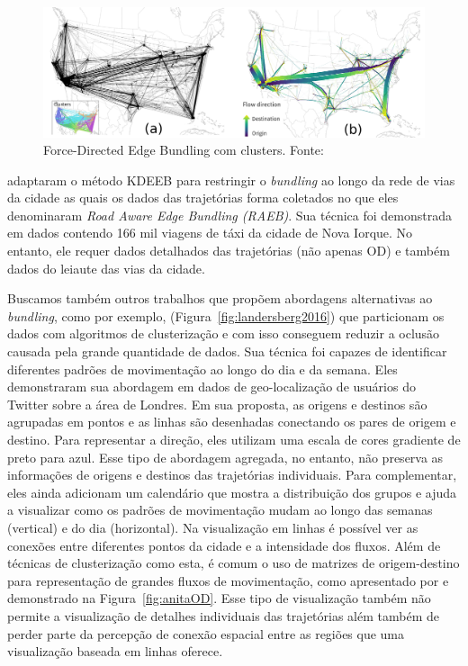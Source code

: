  \begin{figure}[!htb]
  \centering
  \includegraphics[width=\textwidth]{../figuras/anita.png}
  \caption[\emph{Force-Directed Edge Bundling} com clusters]{Force-Directed Edge Bundling com clusters. Fonte: \citet{Anita2017}}
   \label{fig:anita}
 \end{figure}

\citet{zeng:19} adaptaram o método KDEEB para restringir o \emph{bundling} ao
longo da rede de vias da cidade as quais os dados das trajetórias forma
coletados no que eles denominaram \emph{Road Aware Edge Bundling (RAEB)}. Sua
técnica foi demonstrada em dados contendo 166 mil viagens de táxi da cidade de
Nova Iorque. No entanto, ele requer dados detalhados das trajetórias (não apenas
OD) e também dados do leiaute das vias da cidade.

Buscamos também outros trabalhos que propõem abordagens alternativas ao
\emph{bundling}, como por exemplo, \citet{Landersberg2016}
(Figura~\ref{fig:landersberg2016}) que particionam os dados com algoritmos de
clusterização e com isso conseguem reduzir a oclusão causada pela grande
quantidade de dados. Sua técnica foi capazes de identificar diferentes padrões
de movimentação ao longo do dia e da semana. Eles demonstraram sua abordagem em
dados de geo-localização de usuários do Twitter sobre a área de Londres. Em sua
proposta, as origens e destinos são agrupadas em pontos e as linhas são
desenhadas conectando os pares de origem e destino. Para representar a direção,
eles utilizam uma escala de cores gradiente de preto para azul. Esse tipo de
abordagem agregada, no entanto, não preserva as informações de origens e
destinos das trajetórias individuais. Para complementar, eles ainda adicionam um
calendário que mostra a distribuição dos grupos e ajuda a visualizar como os
padrões de movimentação mudam ao longo das semanas (vertical) e do dia
(horizontal). Na visualização em linhas é possível ver as conexões entre
diferentes pontos da cidade e a intensidade dos fluxos. Além de técnicas de
clusterização como esta, é comum o uso de matrizes de origem-destino para
representação de grandes fluxos de movimentação, como apresentado por
\citet{Anita2017} e demonstrado na Figura~\ref{fig:anitaOD}. Esse tipo de
visualização também não permite a visualização de detalhes individuais das
trajetórias além também de perder parte da percepção de conexão
espacial entre as regiões que uma visualização baseada em linhas oferece.

